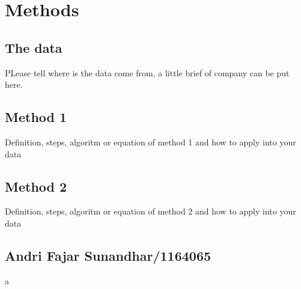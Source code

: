 \chapter{Methods}

\section{The data}
PLease tell where is the data come from, a little brief of company can be put here.

\section{Method 1}
Definition, steps, algoritm or equation of method 1 and how to apply into your data
\section{Method 2}
Definition, steps, algoritm or equation of method 2 and how to apply into your data

\section{Andri Fajar Sunandhar/1164065}a
